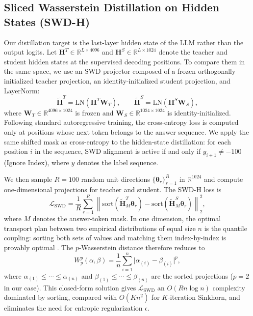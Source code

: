 \documentclass[sigconf]{acmart}
\begin{document}
\subsection{Sliced Wasserstein Distillation on Hidden States (SWD-H)}
\label{subsec:swd}

Our distillation target is the last-layer hidden state of the LLM rather than the output logits. Let $\mathbf{H}^{T}\in\mathbb{R}^{L\times4096}$ and $\mathbf{H}^{S}\in\mathbb{R}^{L\times1024}$ denote the teacher and student hidden states at the supervised decoding positions. To compare them in the same space, we use an SWD projector composed of a frozen orthogonally initialized teacher projection, an identity-initialized student projection, and LayerNorm:
\begin{equation}
\tilde{\mathbf{H}}^{T}=\mathrm{LN}(\mathbf{H}^{T}\mathbf{W}_{T}),
\qquad
\tilde{\mathbf{H}}^{S}=\mathrm{LN}(\mathbf{H}^{S}\mathbf{W}_{S}),
\end{equation}
where $\mathbf{W}_T\in\mathbb{R}^{4096\times1024}$ is frozen and $\mathbf{W}_S\in\mathbb{R}^{1024\times1024}$ is identity-initialized. Following standard autoregressive training, the cross-entropy loss is computed only at positions whose next token belongs to the answer sequence. We apply the same shifted mask as cross-entropy to the hidden-state distillation: for each position $i$ in the sequence, SWD alignment is active if and only if $y_{i+1} \neq -100$ (Ignore Index), where $y$ denotes the label sequence.

We then sample $R=100$ random unit directions $\{\boldsymbol{\theta}_r\}_{r=1}^{R}$ in $\mathbb{R}^{1024}$ and compute one-dimensional projections for teacher and student. The SWD-H loss is
\begin{equation}
\mathcal{L}_{\mathrm{SWD}}
=
\frac{1}{R}
\sum_{r=1}^{R}
\left\|
\mathrm{sort}\!\left(\tilde{\mathbf{H}}^{T}_{M}\boldsymbol{\theta}_r\right)
-
\mathrm{sort}\!\left(\tilde{\mathbf{H}}^{S}_{M}\boldsymbol{\theta}_r\right)
\right\|_2^2,
\end{equation}
where $M$ denotes the answer-token mask. In one dimension, the optimal transport plan between two empirical distributions of equal size $n$ is the quantile coupling: sorting both sets of values and matching them index-by-index is provably optimal \cite{peyre2020}. The $p$-Wasserstein distance therefore reduces to
\begin{equation}
W_p^p(\alpha,\beta)
=
\frac{1}{n}\sum_{i=1}^{n}\bigl|\alpha_{(i)}-\beta_{(i)}\bigr|^{p},
\end{equation}
where $\alpha_{(1)}\!\leq\!\cdots\!\leq\!\alpha_{(n)}$ and $\beta_{(1)}\!\leq\!\cdots\!\leq\!\beta_{(n)}$ are the sorted projections ($p{=}2$ in our case). This closed-form solution gives $\mathcal{L}_{\mathrm{SWD}}$ an $O(Rn\log n)$ complexity dominated by sorting, compared with $O(Kn^{2})$ for $K$-iteration Sinkhorn, and eliminates the need for entropic regularization $\epsilon$.
\end{document}
